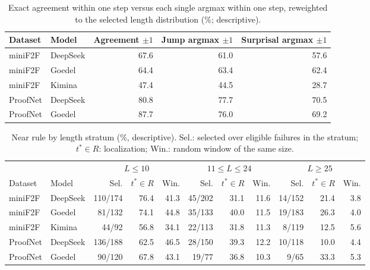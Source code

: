 \begin{table}[h]
\caption{Exact agreement within one step versus each single argmax within one step, reweighted to the selected length distribution (\%; descriptive).}
\label{tab:within1}
\begin{center}
\small
\begin{tabular}{llrrr}
\toprule
Dataset & Model & Agreement $\pm1$ & Jump argmax $\pm1$ & Surprisal argmax $\pm1$\\
\midrule
miniF2F & DeepSeek & 67.6 & 61.0 & 57.6\\
miniF2F & Goedel & 64.4 & 63.4 & 62.4\\
miniF2F & Kimina & 47.4 & 44.5 & 28.7\\
ProofNet & DeepSeek & 80.8 & 77.7 & 70.5\\
ProofNet & Goedel & 87.7 & 76.0 & 69.2\\
\bottomrule
\end{tabular}
\end{center}
\end{table}

\begin{table}[h]
\caption{Near rule by length stratum (\%, descriptive). Sel.: selected over eligible failures in the stratum; $t^*\in R$: localization; Win.: random window of the same size.}
\label{tab:strataL}
\begin{center}
\small
\setlength{\tabcolsep}{4pt}
\begin{tabular}{llrrrrrrrrr}
\toprule
& & \multicolumn{3}{c}{$L\le10$} & \multicolumn{3}{c}{$11\le L\le24$} & \multicolumn{3}{c}{$L\ge25$}\\
\cmidrule(lr){3-5}\cmidrule(lr){6-8}\cmidrule(lr){9-11}
Dataset & Model & Sel. & $t^*\!\in\!R$ & Win. & Sel. & $t^*\!\in\!R$ & Win. & Sel. & $t^*\!\in\!R$ & Win.\\
\midrule
miniF2F & DeepSeek & 110/174 & 76.4 & 41.3 & 45/202 & 31.1 & 11.6 & 14/152 & 21.4 & 3.8\\
miniF2F & Goedel & 81/132 & 74.1 & 44.8 & 35/133 & 40.0 & 11.5 & 19/183 & 26.3 & 4.0\\
miniF2F & Kimina & 44/92 & 56.8 & 34.1 & 22/113 & 31.8 & 11.3 & 8/119 & 12.5 & 5.6\\
ProofNet & DeepSeek & 136/188 & 62.5 & 46.5 & 28/150 & 39.3 & 12.2 & 10/118 & 10.0 & 4.4\\
ProofNet & Goedel & 90/120 & 67.8 & 43.1 & 19/77 & 36.8 & 10.3 & 9/65 & 33.3 & 5.3\\
\bottomrule
\end{tabular}
\end{center}
\end{table}

